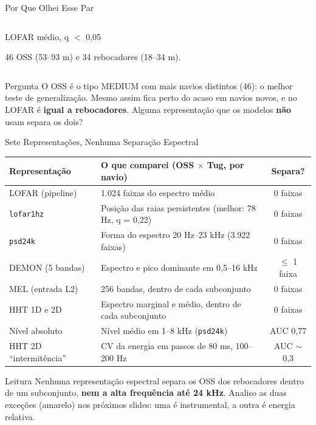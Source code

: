 \documentclass[aspectratio=169]{beamer}
\newcommand{\calo}[1]{\cellcolor{red!20}#1}
\newcommand{\camd}[1]{\cellcolor{yellow!35}#1}
\begin{document}
\begin{frame}{Por Que Olhei Esse Par}
\begin{columns}[t]
\begin{block}{\small LOFAR médio, q $<$ 0,05}
            \vspace{0.05cm}
            {\tiny 46 OSS (53--93 m) e 34 rebocadores (18--34 m).\par}
        \end{block}
    \end{columns}
    \vspace{0.1cm}
    \begin{alertblock}{Pergunta}
        \scriptsize
        O OSS é o tipo MEDIUM com mais navios distintos (46): o melhor teste de generalização. Mesmo assim fica perto do acaso em navios novos, e no LOFAR é \textbf{igual a rebocadores}. Alguma representação que os modelos \textbf{não} usam separa os dois?
    \end{alertblock}
\end{frame}

\begin{frame}{Sete Representações, Nenhuma Separação Espectral}
    \footnotesize
    \begin{table}
    \centering
    \scriptsize
    \begin{tabular}{lp{7.4cm}c}
    \toprule
    \textbf{Representação} & \textbf{O que comparei (OSS $\times$ Tug, por navio)} & \textbf{Separa?} \\
    \midrule
    LOFAR (pipeline) & 1.024 faixas do espectro médio & \calo{0 faixas} \\
    \texttt{lofar1hz} & Posição das raias persistentes (melhor: 78 Hz, q = 0,22) & \calo{0 faixas} \\
    \texttt{psd24k} & Forma do espectro 20 Hz--23 kHz (3.922 faixas) & \calo{0 faixas} \\
    DEMON (5 bandas) & Espectro e pico dominante em 0,5--16 kHz & \calo{$\leq$ 1 faixa} \\
    MEL (entrada L2) & 256 bandas, dentro de cada subconjunto & \calo{0 faixas} \\
    HHT 1D e 2D & Espectro marginal e médio, dentro de cada subconjunto & \calo{0 faixas} \\
    \midrule
    Nível absoluto & Nível médio em 1--8 kHz (\texttt{psd24k}) & \camd{AUC 0,77} \\
    HHT 2D ``intermitência'' & CV da energia em passos de 80 ms, 100--200 Hz & \camd{AUC $\sim$0,3} \\
    \bottomrule
    \end{tabular}
    \end{table}
    \vspace{0.05cm}
    \begin{alertblock}{Leitura}
        \scriptsize
        Nenhuma representação espectral separa os OSS dos rebocadores dentro de um subconjunto, \textbf{nem a alta frequência até 24 kHz}. Analiso as duas exceções (amarelo) nos próximos slides: uma é instrumental, a outra é energia relativa.
    \end{alertblock}
\end{frame}
\end{document}
